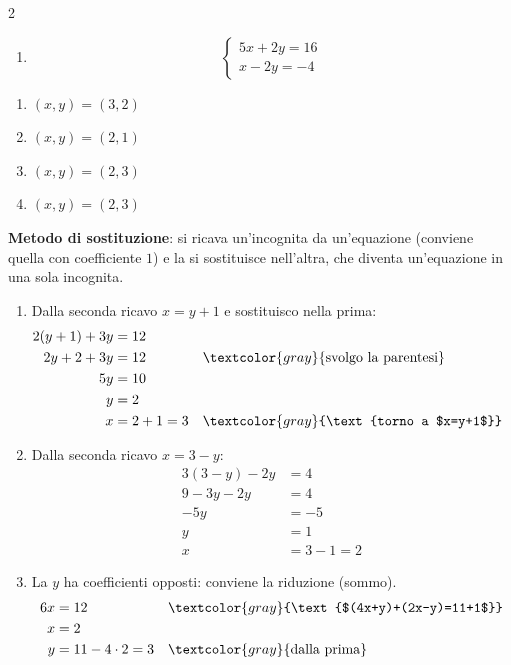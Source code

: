\begin{question}[ID=1.2, subtitle={Sistemi lineari con coefficienti interi}, difficulty=facile, tags={sistemi, equazioni lineari}]
\begin{multicols}{2}
\begin{enumerate}[leftmargin=3.2cm]
    \item
    \[
    \begin{cases}
    5x+2y=16\\
    x-2y=-4
    \end{cases}
    \]
\end{enumerate}
\end{multicols}
\begin{solution}
\begin{enumerate}
    \item $(x,y)=(3,2)$
    \item $(x,y)=(2,1)$
    \item $(x,y)=(2,3)$
    \item $(x,y)=(2,3)$
\end{enumerate}
\end{solution}
\begin{explanation}
\textbf{Metodo di sostituzione}: si ricava un'incognita da un'equazione (conviene quella con coefficiente $1$) e la si sostituisce nell'altra, che diventa un'equazione in una sola incognita.
\begin{enumerate}
    \item Dalla seconda ricavo $x=y+1$ e sostituisco nella prima:
    \[\begin{aligned}
    2(y+1)+3y &= 12\\
    2y+2+3y &= 12 && \textcolor{gray}{\text{svolgo la parentesi}}\\
    5y &= 10\\
    y &= 2\\
    x &= 2+1=3 && \textcolor{gray}{\text{torno a $x=y+1$}}
    \end{aligned}\]
    \item Dalla seconda ricavo $x=3-y$:
    \[\begin{aligned}
    3(3-y)-2y &= 4\\
    9-3y-2y &= 4\\
    -5y &= -5\\
    y &= 1\\
    x &= 3-1=2
    \end{aligned}\]
    \item La $y$ ha coefficienti opposti: conviene la riduzione (sommo).
    \[\begin{aligned}
    6x &= 12 && \textcolor{gray}{\text{$(4x+y)+(2x-y)=11+1$}}\\
    x &= 2\\
    y &= 11-4\cdot2=3 && \textcolor{gray}{\text{dalla prima}}
    \end{aligned}\]

\end{enumerate}
\end{explanation}
\end{question}
